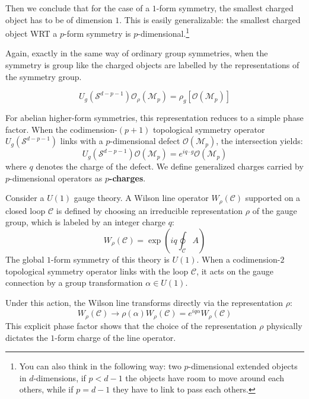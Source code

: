 \documentclass[aps,preprint,nofootinbib,preprintnumbers,eqsecnum,superscriptaddress]{revtex4}
\numberwithin{equation}{section}
\begin{document}
Then we conclude that for the case of a $1$-form symmetry, the smallest charged object has to be of dimension $1$. This is easily generalizable: the smallest charged object WRT a $p$-form symmetry is $p$-dimensional.\footnote{You can also think in the following way: two $p$-dimensional extended objects in $d$-dimensions, if $p < d-1$ the objects have room to move around each others, while if $p=d-1$ they have to link to pass each others.}

Again, exactly in the same way of ordinary group symmetries, when the symmetry is group like the charged objects are labelled by the representations of the symmetry group.

\begin{equation}
U_g (\mathcal{S}^{d-p-1}) \mathcal{O}_\rho (\mathcal{M}_p) =  \rho_g [\mathcal{O}(\mathcal{M}_p)]
\end{equation}
 



For abelian higher-form symmetries, this representation reduces to a simple phase factor. When the codimension-$(p+1)$ topological symmetry operator $U_g(\mathcal{S}^{d-p-1})$ links with a $p$-dimensional defect $\mathcal{O}(\mathcal{M}_p)$, the intersection yields:\begin{equation}U_g (\mathcal{S}^{d-p-1}) \mathcal{O}(\mathcal{M}_p) = e^{i q \cdot g} \mathcal{O}(\mathcal{M}_p)\end{equation}where $q$ denotes the charge of the defect. We define generalized charges carried by $p$-dimensional operators as \textbf{$p$-charges}. 

\begin{tcolorbox}[colback=green!5!white, colframe=green!75!black, title={Example: Wilson lines and Representations}]
Consider a $U(1)$ gauge theory. A Wilson line operator $W_\rho(\mathcal{C})$ supported on a closed loop $\mathcal{C}$ is defined by choosing an irreducible representation $\rho$ of the gauge group, which is labeled by an integer charge $q$:
\begin{equation}
    W_\rho(\mathcal{C}) = \exp \left( i q \oint_{\mathcal{C}} A \right)
\end{equation}
The global $1$-form symmetry of this theory is $U(1)$. When a codimension-$2$ topological symmetry operator links with the loop $\mathcal{C}$, it acts on the gauge connection by a group transformation $\alpha \in U(1)$. 

Under this action, the Wilson line transforms directly via the representation $\rho$:
\begin{equation}
    W_\rho(\mathcal{C}) \longrightarrow \rho(\alpha) W_\rho(\mathcal{C}) = e^{i q \alpha} W_\rho(\mathcal{C})
\end{equation}
This explicit phase factor shows that the choice of the representation $\rho$ physically dictates the $1$-form charge of the line operator.
\end{tcolorbox}
\end{document}
